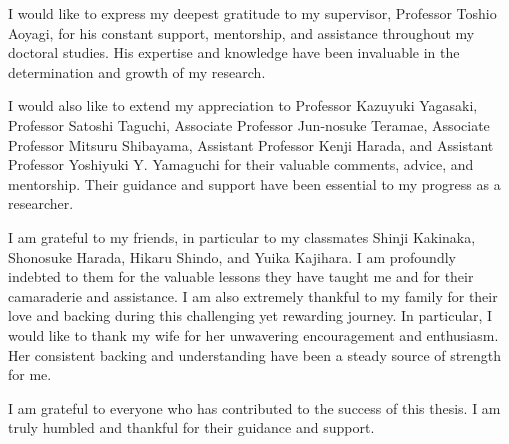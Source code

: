 I would like to express my deepest gratitude to my supervisor, Professor Toshio Aoyagi, for his constant support, mentorship, and assistance throughout my doctoral studies. His expertise and knowledge have been invaluable in the determination and growth of my research.


I would also like to extend my appreciation to Professor Kazuyuki Yagasaki, Professor Satoshi Taguchi, Associate Professor Jun-nosuke Teramae, Associate Professor Mitsuru Shibayama, Assistant Professor Kenji Harada, and Assistant Professor Yoshiyuki Y. Yamaguchi for their valuable comments, advice, and mentorship. Their guidance and support have been essential to my progress as a researcher.


I am grateful to my friends, in particular to my classmates Shinji Kakinaka, Shonosuke Harada, Hikaru Shindo, and Yuika Kajihara.
I am profoundly indebted to them for the valuable lessons they have taught me and for their camaraderie and assistance.
I am also extremely thankful to my family for their love and backing during this challenging yet rewarding journey.
In particular, I would like to thank my wife for her unwavering encouragement and enthusiasm. Her consistent backing and understanding have been a steady source of strength for me.


I am grateful to everyone who has contributed to the success of this thesis. I am truly humbled and thankful for their guidance and support.